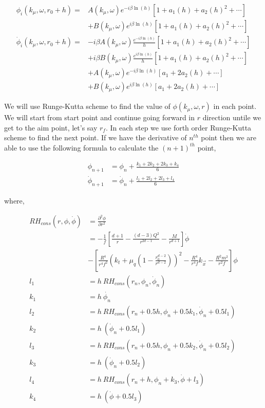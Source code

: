 \begin{align}
    \phi_i(k_\mu,\omega,r_0 + h) =& A(k_\mu,\omega)e^{-i\beta\ln{(h)}}\left[1+a_1(h)+ a_2(h)^2 + \cdots \right] \nonumber\\
             & + B(k_\mu,\omega)e^{i\beta\ln{(h)}}\left[1+a_1(h)+ a_2(h)^2 + \cdots \right] \nonumber\\
    \dot{\phi}_i(k_\mu,\omega,r_0 + h) =& -i\beta A(k_\mu,\omega)\frac{e^{-i\beta\ln{(h)}}}{h}\left[1+a_1(h)+ a_2(h)^2 + \cdots \right] \nonumber\\
             & + i\beta B(k_\mu,\omega)\frac{e^{i\beta\ln{(h)}}}{h}\left[1+a_1(h)+ a_2(h)^2 + \cdots \right] \nonumber\\
             & + A(k_\mu,\omega)e^{-i\beta\ln{(h)}}\left[a_1+ 2a_2(h) + \cdots \right] \nonumber\\
             & + B(k_\mu,\omega)e^{i\beta\ln{(h)}}\left[a_1+ 2a_2(h) + \cdots \right]
\end{align}

We will use Runge-Kutta scheme to find the value of $\phi(k_\mu,\omega,r)$ in each point. We will start from start point and continue going forward in $r$ direction untile we get to the aim point, let's say $r_f$. In each step we use forth order Runge-Kutta scheme to find the next point. If we have the derivative of $n^{th}$ point then we are able to use the following formula to calculate the $(n+1)^{th}$ point,

\begin{align}
    \phi_{n+1}       &= \phi_n  + \frac{k_1+2k_2+2k_3+k_4}{6} \nonumber\\
    \dot{\phi}_{n+1} &= \dot{\phi}_n + \frac{l_1+2l_2+2l_3+l_4}{6}
\end{align}

where,

\begin{align}
    RH_{cons}(r,\phi,\dot{\phi}) &= \frac{\partial^2\phi}{\partial r^2} \nonumber\\
              &= - \frac{1}{f}\left[\frac{d+1}{r}-\frac{(d-3)Q^2}{r^{2d-1}}-\frac{M}{r^{d+1}}\right]\dot{\phi} \nonumber\\ 
              & - \left[\frac{R^4}{r^4f^2}\left(k_t + \mu_q(1-\frac{r_0^{d-2}}{r^{d-2}})\right)^2-\frac{R^4}{r^4f}k_{\vec{x}}-\frac{R^2m^2}{r^2f}\right]\phi \nonumber\\
    l_1 &= h~RH_{cons}(r_n,\phi_n,\dot{\phi}_n) \nonumber\\
    k_1 &= h~\dot{\phi_n} \nonumber\\
    l_2 &= h~RH_{cons}( r_n+0.5h , \phi_n+0.5k_1 , \dot{\phi}_n+0.5l_1) \nonumber\\
    k_2 &= h~(\dot{\phi}_n+0.5l_1) \nonumber\\
    l_3 &= h~RH_{cons}( r_n+0.5h , \phi_n+0.5k_2 , \dot{\phi}_n+0.5l_2) \nonumber\\
    k_3 &= h~(\dot{\phi}_n+0.5l_2) \nonumber\\
    l_4 &= h~RH_{cons}( r_n+h , \phi_n+k_3 , \dot{\phi}+l_3) \nonumber\\ 
    k_4 &= h~(\dot{\phi}+0.5l_3) \nonumber\\
\end{align}

